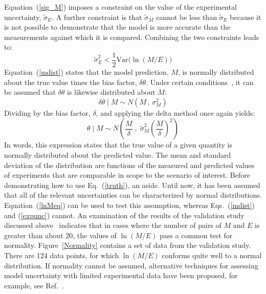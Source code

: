 \documentclass[fleqn,b5paper]{article}
\begin{document}
Equation~(\ref{sig_M}) imposes a constraint on the value of the experimental uncertainty, $\widetilde{\sigma}_E$. A further constraint is that $\widetilde{\sigma}_M$ cannot be less than $\widetilde{\sigma}_E$ because it is not possible to demonstrate that the model is more accurate than the measurements against which it is compared. Combining the two constraints leads to:
\begin{equation}
   \widetilde{\sigma}_E^2 < \frac{1}{2} \mathrm{Var}\Big( \ln (M/E) \Big)
\end{equation}
Equation~(\ref{mdist}) states that the model prediction, $M$, is normally distributed about the true value times the bias factor, $\delta \theta$. Under certain conditions~\cite{McGrattan:Metrologia}, it can be assumed that $\delta \theta$ is likewise distributed about $M$:
\begin{equation}
   \delta \theta \; | \; M \sim N \left(M \, , \, \sigma_M^2 \right) \label{thetaeq}
\end{equation} 
Dividing by the bias factor, $\delta$, and applying the delta method once again yields:
\begin{equation}    
   \theta \; | \; M \sim N \left( \frac{M}{\delta} \; , \; \widetilde{\sigma}_M^2 \left( \frac{M}{\delta} \right)^2 \right) \label{truth}
\end{equation}
In words, this expression states that the true value of a given quantity is normally distributed about the predicted value. The mean and standard deviation of the distribution are functions of the measured and predicted values of experiments that are comparable in scope to the scenario of interest. Before demonstrating how to use Eq.~(\ref{truth}), an aside. Until now, it has been assumed that all of the relevant uncertainties can be characterized by normal distributions. Equation~(\ref{lnMeq}) can be used to test this assumption, whereas Eqs.~(\ref{mdist}) and (\ref{expunc}) cannot. An examination of the results of the validation study discussed above~\cite{NUREG_1824} indicates that in cases where the number of pairs of $M$ and $E$ is greater than about 20, the values of $\ln (M/E)$ pass a common test for normality. Figure~\ref{Normality} contains a set of data from the validation study. There are 124 data points, for which $\ln (M/E)$ conforms quite well to a normal distribution. If normality cannot be assumed, alternative techniques for assessing model uncertainty with limited experimental data have been proposed, for example, see Ref.~\cite{Siu:1992}.
\end{document}

